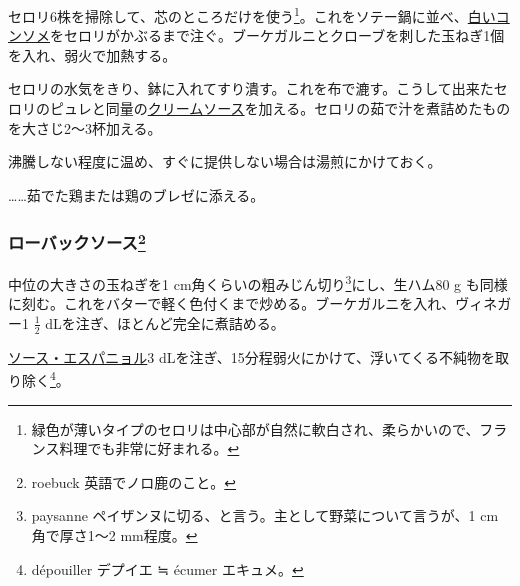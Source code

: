 \begin{recette}
セロリ6株を掃除して、芯のところだけを使う\footnote{緑色が薄いタイプのセロリは中心部が自然に軟白され、柔らかいので、フランス料理でも非常に好まれる。}。これをソテー鍋に並べ、\protect\hyperlink{}{白いコンソメ}をセロリがかぶるまで注ぐ。ブーケガルニとクローブを刺した玉ねぎ1個を入れ、弱火で加熱する。

セロリの水気をきり、鉢に入れてすり潰す。これを布で漉す。こうして出来たセロリのピュレと同量の\protect\hyperlink{cream-sauce}{クリームソース}を加える。セロリの茹で汁を煮詰めたものを大さじ2〜3杯加える。

沸騰しない程度に温め、すぐに提供しない場合は湯煎にかけておく。

\ldots{}\ldots{}茹でた鶏または鶏のブレゼに添える。

\atoaki{}

\hypertarget{roe-buck-sauce}{%
\subsubsection[ローバックソース]{\texorpdfstring{ローバックソース\footnote{roebuck
  英語でノロ鹿のこと。}}{ローバックソース}}\label{roe-buck-sauce}}



中位の大きさの玉ねぎを1 cm角くらいの粗みじん切り\footnote{paysanne
  ペイザンヌに切る、と言う。主として野菜について言うが、1 cm角で厚さ1〜2
  mm程度。}にし、生ハム80 g
も同様に刻む。これをバターで軽く色付くまで炒める。ブーケガルニを入れ、ヴィネガー1
\(\frac{1}{2}\) dLを注ぎ、ほとんど完全に煮詰める。

\protect\hyperlink{sauce-espagnole}{ソース・エスパニョル}3
dLを注ぎ、15分程弱火にかけて、浮いてくる不純物を取り除く\footnote{dépouiller
  デプイエ ≒ écumer エキュメ。}。


\end{recette}
